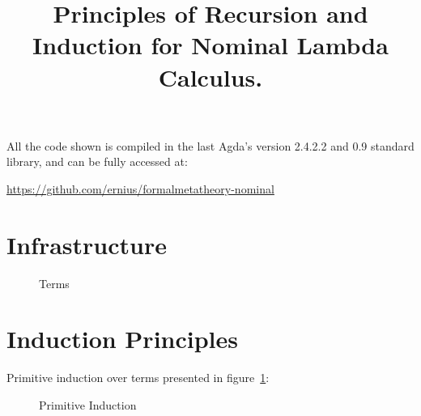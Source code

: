 \documentclass{article}
\title{Principles of Recursion and Induction for Nominal Lambda Calculus.}
\begin{document}
\maketitle

All the code shown is compiled in the last Agda's version 2.4.2.2 and 0.9 standard library, and can be fully accessed at:

\begin{center}
  \href{https://github.com/ernius/formalmetatheory-nominal}{https://github.com/ernius/formalmetatheory-nominal}
\end{center}

\section{Infrastructure}
\label{sec:infra}

\begin{figure}[!ht]
   \hspace{5px}
  \caption{Terms}
\label{fig:term}
\end{figure}

 \hspace{5px}

 \hspace{5px}

 \hspace{5px}

 \hspace{5px}

 \hspace{5px}



\section{Induction Principles}
\label{sec:induction}

Primitive induction over terms  presented in figure~\ref{fig:term}:

\begin{figure}[!ht]
  \caption{Primitive Induction}
\label{fig:primInd}
\end{figure}
\end{document}
